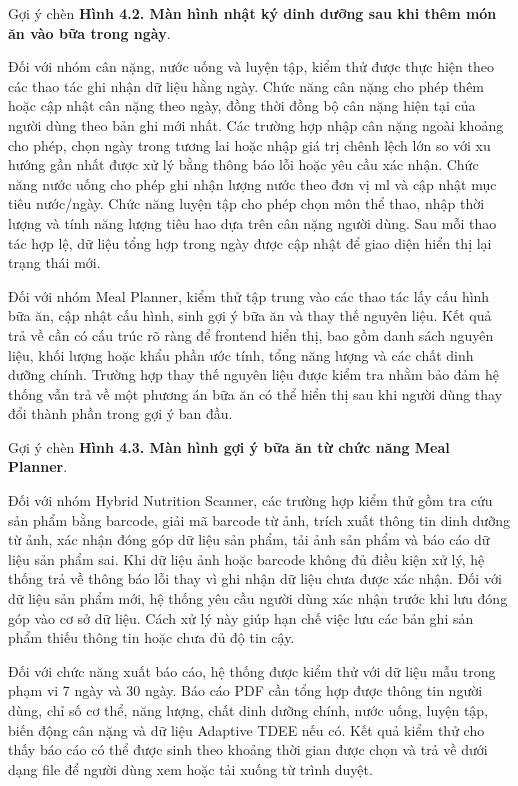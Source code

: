 Gợi ý chèn \textbf{Hình 4.2. Màn hình nhật ký dinh dưỡng sau khi thêm món ăn vào bữa trong ngày}.

Đối với nhóm cân nặng, nước uống và luyện tập, kiểm thử được thực hiện theo các thao tác ghi nhận dữ liệu hằng ngày. Chức năng cân nặng cho phép thêm hoặc cập nhật cân nặng theo ngày, đồng thời đồng bộ cân nặng hiện tại của người dùng theo bản ghi mới nhất. Các trường hợp nhập cân nặng ngoài khoảng cho phép, chọn ngày trong tương lai hoặc nhập giá trị chênh lệch lớn so với xu hướng gần nhất được xử lý bằng thông báo lỗi hoặc yêu cầu xác nhận. Chức năng nước uống cho phép ghi nhận lượng nước theo đơn vị ml và cập nhật mục tiêu nước/ngày. Chức năng luyện tập cho phép chọn môn thể thao, nhập thời lượng và tính năng lượng tiêu hao dựa trên cân nặng người dùng. Sau mỗi thao tác hợp lệ, dữ liệu tổng hợp trong ngày được cập nhật để giao diện hiển thị lại trạng thái mới.

Đối với nhóm Meal Planner, kiểm thử tập trung vào các thao tác lấy cấu hình bữa ăn, cập nhật cấu hình, sinh gợi ý bữa ăn và thay thế nguyên liệu. Kết quả trả về cần có cấu trúc rõ ràng để frontend hiển thị, bao gồm danh sách nguyên liệu, khối lượng hoặc khẩu phần ước tính, tổng năng lượng và các chất dinh dưỡng chính. Trường hợp thay thế nguyên liệu được kiểm tra nhằm bảo đảm hệ thống vẫn trả về một phương án bữa ăn có thể hiển thị sau khi người dùng thay đổi thành phần trong gợi ý ban đầu.

Gợi ý chèn \textbf{Hình 4.3. Màn hình gợi ý bữa ăn từ chức năng Meal Planner}.

Đối với nhóm Hybrid Nutrition Scanner, các trường hợp kiểm thử gồm tra cứu sản phẩm bằng barcode, giải mã barcode từ ảnh, trích xuất thông tin dinh dưỡng từ ảnh, xác nhận đóng góp dữ liệu sản phẩm, tải ảnh sản phẩm và báo cáo dữ liệu sản phẩm sai. Khi dữ liệu ảnh hoặc barcode không đủ điều kiện xử lý, hệ thống trả về thông báo lỗi thay vì ghi nhận dữ liệu chưa được xác nhận. Đối với dữ liệu sản phẩm mới, hệ thống yêu cầu người dùng xác nhận trước khi lưu đóng góp vào cơ sở dữ liệu. Cách xử lý này giúp hạn chế việc lưu các bản ghi sản phẩm thiếu thông tin hoặc chưa đủ độ tin cậy.

Đối với chức năng xuất báo cáo, hệ thống được kiểm thử với dữ liệu mẫu trong phạm vi 7 ngày và 30 ngày. Báo cáo PDF cần tổng hợp được thông tin người dùng, chỉ số cơ thể, năng lượng, chất dinh dưỡng chính, nước uống, luyện tập, biến động cân nặng và dữ liệu Adaptive TDEE nếu có. Kết quả kiểm thử cho thấy báo cáo có thể được sinh theo khoảng thời gian được chọn và trả về dưới dạng file để người dùng xem hoặc tải xuống từ trình duyệt.


